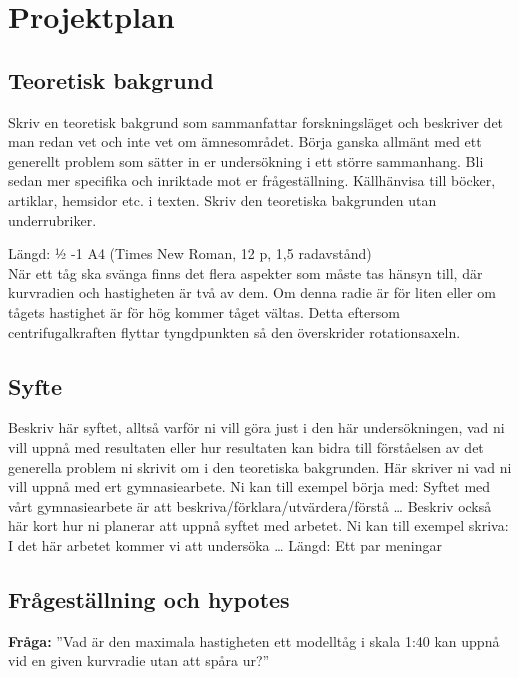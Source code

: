 \section{Projektplan}
\subsection{Teoretisk bakgrund}
Skriv en teoretisk bakgrund som sammanfattar forskningsläget och beskriver det man redan vet och inte vet om ämnesområdet. Börja ganska allmänt med ett generellt problem som sätter in er undersökning i ett större sammanhang. Bli sedan mer specifika och inriktade mot er frågeställning. Källhänvisa till böcker, artiklar, hemsidor etc. i texten. Skriv den teoretiska bakgrunden utan underrubriker.

Längd: ½ -1 A4 (Times New Roman, 12 p, 1,5 radavstånd)
\\[2em]
När ett tåg ska svänga finns det flera aspekter som måste tas hänsyn till, där kurvradien och hastigheten är två av dem. Om denna radie är för liten eller om tågets hastighet är för hög kommer tåget vältas. Detta eftersom centrifugalkraften flyttar tyngdpunkten så den överskrider rotationsaxeln.
\subsection{Syfte}
Beskriv här syftet, alltså varför ni vill göra just i den här undersökningen, vad ni vill uppnå med resultaten eller hur resultaten kan bidra till förståelsen av det generella problem ni skrivit om i den teoretiska bakgrunden. Här skriver ni vad ni vill uppnå med ert gymnasiearbete. Ni kan till exempel börja med: Syftet med vårt gymnasiearbete är att beskriva/förklara/utvärdera/förstå … Beskriv också här kort hur ni planerar att uppnå syftet med arbetet. Ni kan till exempel skriva: I det här arbetet kommer vi att undersöka …
Längd: Ett par meningar

\subsection{Frågeställning och hypotes}
\textbf{Fråga:} ''Vad är den maximala hastigheten ett modelltåg i skala 1:40 kan uppnå vid en given kurvradie utan att spåra ur?''

